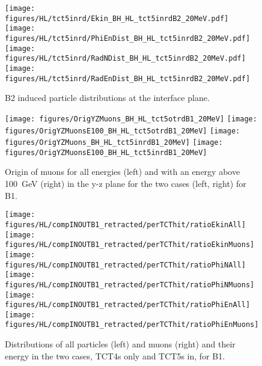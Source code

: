 \begin{figure}
\begin{center}
\texttt{[image: figures/HL/tct5inrd/Ekin\_BH\_HL\_tct5inrdB2\_20MeV.pdf]}
\texttt{[image: figures/HL/tct5inrd/PhiEnDist\_BH\_HL\_tct5inrdB2\_20MeV.pdf]}
\texttt{[image: figures/HL/tct5inrd/RadNDist\_BH\_HL\_tct5inrdB2\_20MeV.pdf]}
\texttt{[image: figures/HL/tct5inrd/RadEnDist\_BH\_HL\_tct5inrdB2\_20MeV.pdf]}
\end{center}
\vspace{-0.6cm}
 \caption{B2 induced particle distributions at the interface plane.}
  \label{tct5inrdb2retr}
\end{figure}


\begin{figure}
\begin{center}
\texttt{[image: figures/OrigYZMuons\_BH\_HL\_tct5otrdB1\_20MeV]}
\texttt{[image: figures/OrigYZMuonsE100\_BH\_HL\_tct5otrdB1\_20MeV]}
\texttt{[image: figures/OrigYZMuons\_BH\_HL\_tct5inrdB1\_20MeV]}
\texttt{[image: figures/OrigYZMuonsE100\_BH\_HL\_tct5inrdB1\_20MeV]}
\end{center}
\vspace{-0.6cm}
 \caption{Origin of muons for all energies (left) and with an energy above 100~GeV (right) in the y-z plane for the two cases (left, right) for B1.
  \label{OrigMuon}}
\end{figure}


\begin{figure}
\centering
\texttt{[image: figures/HL/compINOUTB1\_retracted/perTCThit/ratioEkinAll]}
\texttt{[image: figures/HL/compINOUTB1\_retracted/perTCThit/ratioEkinMuons]}
\texttt{[image: figures/HL/compINOUTB1\_retracted/perTCThit/ratioPhiNAll]}
\texttt{[image: figures/HL/compINOUTB1\_retracted/perTCThit/ratioPhiNMuons]}
\texttt{[image: figures/HL/compINOUTB1\_retracted/perTCThit/ratioPhiEnAll]}
\texttt{[image: figures/HL/compINOUTB1\_retracted/perTCThit/ratioPhiEnMuons]}
 \caption{Distributions of all particles (left) and muons (right) and their energy in the two cases, TCT4s only and TCT5s in, for B1.
  \label{fig:compInOutB1}}
\end{figure}




